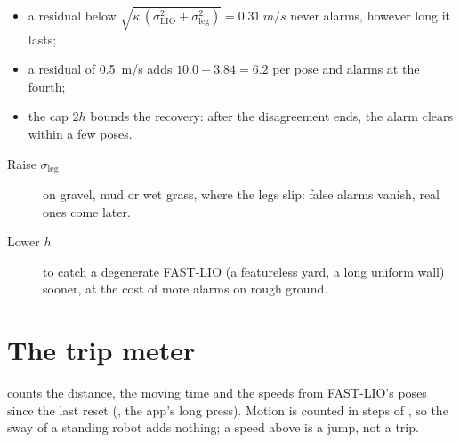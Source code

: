 \begin{itemize}
  \item a residual below $\sqrt{\kappa\,(\sigma_{\text{LIO}}^2 + \sigma_{\text{leg}}^2)} =
    \SI{0.31}{m/s}$ never alarms, however long it lasts;
  \item a residual of \SI{0.5}{m/s} adds $10.0 - 3.84 = 6.2$ per pose and alarms at the fourth;
  \item the cap $2h$ bounds the recovery: after the disagreement ends, the alarm clears within
    a few poses.
\end{itemize}

\begin{description}
  \item[Raise $\sigma_{\text{leg}}$] on gravel, mud or wet grass, where the legs slip: false
    alarms vanish, real ones come later.
  \item[Lower $h$] to catch a degenerate FAST-LIO (a featureless yard, a long uniform wall)
    sooner, at the cost of more alarms on rough ground.
\end{description}

\section{The trip meter}

 counts the distance, the moving time and the speeds from FAST-LIO's poses
since the last reset (, the app's long press). Motion is counted in steps
of , so the sway of a standing robot adds nothing; a speed above  is
a jump, not a trip.
